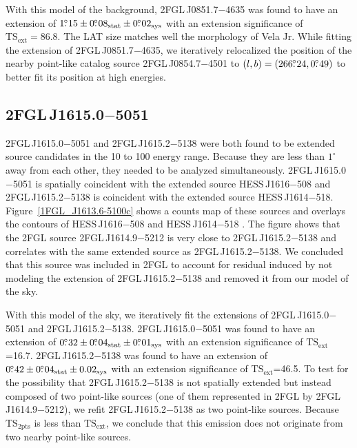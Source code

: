 \documentclass[12pt,preprint]{aastex}
\newcommand{\gev}{\text{GeV}\xspace}
\newcommand{\tev}{\text{TeV}\xspace}
\newcommand{\tsext}{{\ensuremath{\text{TS}_{\text{ext}}}}\xspace}
\newcommand{\tsinc}{\ensuremath{\text{TS}_{\text{2pts}}}\xspace}
\newcommand{\sys}{\text{sys}\xspace}
\newcommand{\stat}{\text{stat}\xspace}
\newcommand{\degree}{^\circ\xspace}
\begin{document}
With this model of the background, 2FGL\,J0851.7$-$4635 was found to
have an extension of $1\fdg15\pm0\fdg08_\stat\pm0\fdg02_\sys$ with
an extension significance of $\tsext=86.8$.  The LAT size matches
well the \tev morphology of Vela Jr.  While fitting the extension
of 2FGL\,J0851.7$-$4635, we iteratively relocalized the position
of the nearby point-like catalog source 2FGL\,J0854.7$-$4501 to
$(l,b)=(266\mbox{$.\!\!^\circ$}24,0\mbox{$.\!\!^\circ$}49)$ to better fit its position at high energies.


\subsection{2FGL\,J1615.0$-$5051}
\label{section_2FGL_J1615.0-5051}


2FGL\,J1615.0$-$5051 and 2FGL\,J1615.2$-$5138 were both found to be
extended source candidates in the 10 \gev to 100 \gev energy range. Because
they are less than $1\degree$ away from each other, they needed to be analyzed
simultaneously.  2FGL\,J1615.0$-$5051 is spatially coincident with
the extended \tev source HESS\,J1616$-$508 and 2FGL\,J1615.2$-$5138
is coincident with the extended \tev source HESS\,J1614$-$518.
Figure~\ref{1FGL_J1613.6-5100c} shows a counts map of these sources and
overlays the \tev contours of HESS\,J1616$-$508 and HESS\,J1614$-$518
\citep{hess_plane_survey}.  The figure shows that the 2FGL source
2FGL\,J1614.9$-$5212 is very close to 2FGL\,J1615.2$-$5138 and correlates
with the same extended \tev source as 2FGL\,J1615.2$-$5138.  We concluded
that this source was included in 2FGL to account for residual induced
by not modeling the extension of 2FGL\,J1615.2$-$5138 and removed
it from our model of the sky.  

With this model of the sky, we iteratively fit the extensions of
2FGL\,J1615.0$-$5051 and 2FGL\,J1615.2$-$5138.
2FGL\,J1615.0$-$5051 was found to have an extension of
$0\fdg32\pm0\fdg04_\stat\pm0\fdg01_\sys$ with an extension significance
of \tsext=16.7.  
2FGL\,J1615.2$-$5138 was found
 to have an extension of $0\fdg42\pm0\fdg04_\stat\pm0.02_\sys$
with an extension significance of \tsext=46.5.
To test for the possibility that
2FGL\,J1615.2$-$5138 is not spatially extended but instead composed
of two point-like sources (one of them represented in 2FGL by
2FGL\,J1614.9$-$5212), we refit 2FGL\,J1615.2$-$5138 as two point-like
sources.  Because \tsinc is less than \tsext, we conclude that
this emission does not originate from two nearby point-like sources.
\end{document}
